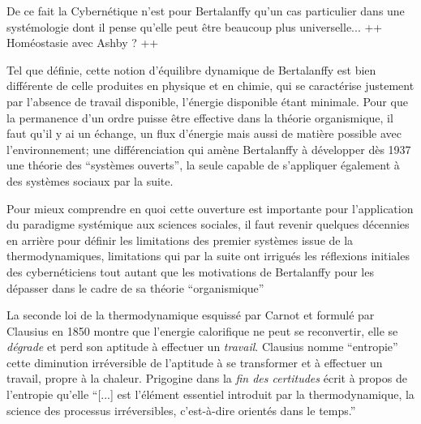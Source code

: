 De ce fait la Cybernétique n'est pour Bertalanffy qu'un cas particulier dans une systémologie dont il pense qu'elle peut être beaucoup plus universelle... ++ Homéostasie avec Ashby ? ++

Tel que définie, cette notion d'équilibre dynamique de Bertalanffy est bien différente de celle produites en physique et en chimie, qui se caractérise justement par l'absence de travail disponible, l'énergie disponible étant minimale. Pour que la permanence d'un ordre puisse être effective dans la théorie organismique, il faut qu'il y ai un échange, un flux d'énergie mais aussi de matière possible avec l'environnement; une différenciation qui amène Bertalanffy à développer dès 1937 une théorie des \enquote{systèmes ouverts}, la seule capable de s'appliquer également à des systèmes sociaux par la suite.

Pour mieux comprendre en quoi cette ouverture est importante pour l'application du paradigme systémique aux sciences sociales, il faut revenir quelques décennies en arrière pour définir les limitations des premier systèmes issue de la thermodynamiques, limitations qui par la suite ont irrigués les réflexions initiales des cybernéticiens tout autant que les motivations de Bertalanffy pour les dépasser dans le cadre de sa théorie \enquote{organismique}

La seconde loi de la thermodynamique esquissé par Carnot et formulé par Clausius en 1850 montre que l'energie calorifique ne peut se reconvertir, elle se \textit{dégrade} et perd son aptitude à effectuer un \textit{travail}. Clausius nomme \enquote{entropie} cette diminution irréversible de l'aptitude à se transformer et à effectuer un travail, propre à la chaleur.\autocite[35]{Morin1977} Prigogine dans la \textit{fin des certitudes} écrit à propos de l'entropie qu'elle \enquote{[...] est l’élément essentiel introduit par la thermodynamique, la science des processus irréversibles, c’est-à-dire orientés dans le temps.} 

